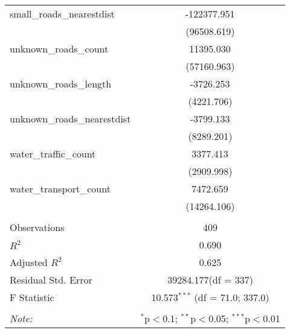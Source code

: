 \begin{table}[!htbp]
\begin{tabular}{@{\extracolsep{5pt}}lc}
 small_roads_nearestdist & -122377.951$^{}$ \\
  & (96508.619) \\
 unknown_roads_count & 11395.030$^{}$ \\
  & (57160.963) \\
 unknown_roads_length & -3726.253$^{}$ \\
  & (4221.706) \\
 unknown_roads_nearestdist & -3799.133$^{}$ \\
  & (8289.201) \\
 water_traffic_count & 3377.413$^{}$ \\
  & (2909.998) \\
 water_transport_count & 7472.659$^{}$ \\
  & (14264.106) \\
\hline \\[-1.8ex]
 Observations & 409 \\
 $R^2$ & 0.690 \\
 Adjusted $R^2$ & 0.625 \\
 Residual Std. Error & 39284.177(df = 337)  \\
 F Statistic & 10.573$^{***}$ (df = 71.0; 337.0) \\
\hline
\hline \\[-1.8ex]
\textit{Note:} & \multicolumn{1}{r}{$^{*}$p$<$0.1; $^{**}$p$<$0.05; $^{***}$p$<$0.01} \\
\end{tabular}
\end{table}